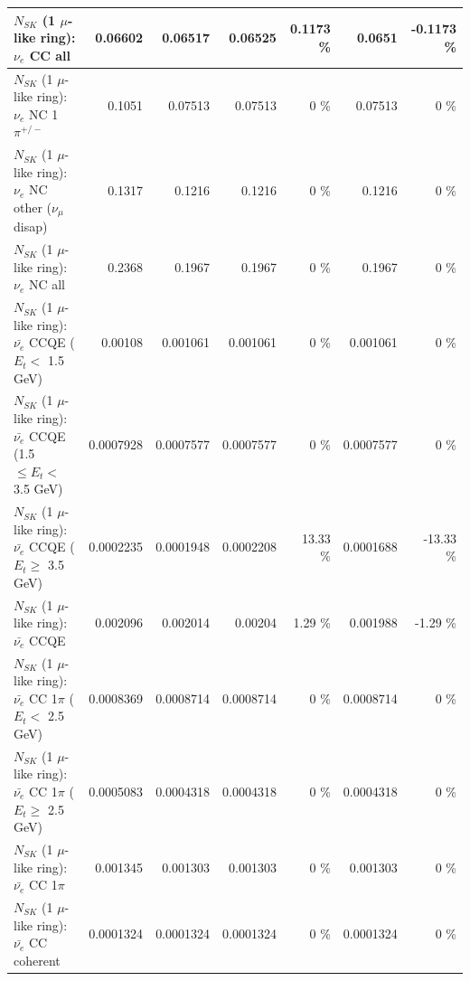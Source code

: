 \begin{table}
\begin{tabular}{| l | r | r | r  r | r  r |}
                                  $N_{SK}$ (1 $\mu$-like ring): $\nu_{e}$ CC all &         0.06602 &         0.06517 &         0.06525 &   0.1173 \%  &          0.0651 &  -0.1173 \%  \\ 
\hline
                           $N_{SK}$ (1 $\mu$-like ring): $\nu_e$ NC 1$\pi^{+/-}$ &          0.1051 &         0.07513 &         0.07513 &        0 \%  &         0.07513 &        0 \%  \\ 
                $N_{SK}$ (1 $\mu$-like ring): $\nu_e$ NC other ($\nu_\mu$ disap) &          0.1317 &          0.1216 &          0.1216 &        0 \%  &          0.1216 &        0 \%  \\ 
                                  $N_{SK}$ (1 $\mu$-like ring): $\nu_{e}$ NC all &          0.2368 &          0.1967 &          0.1967 &        0 \%  &          0.1967 &        0 \%  \\ 
\hline
\hline
\hline
            $N_{SK}$ (1 $\mu$-like ring): $\bar{\nu_e}$ CCQE ($E_{t} <$ 1.5 GeV) &         0.00108 &        0.001061 &        0.001061 &        0 \%  &        0.001061 &        0 \%  \\ 
   $N_{SK}$ (1 $\mu$-like ring): $\bar{\nu_e}$ CCQE (1.5 $\leq E_{t} <$ 3.5 GeV) &       0.0007928 &       0.0007577 &       0.0007577 &        0 \%  &       0.0007577 &        0 \%  \\ 
         $N_{SK}$ (1 $\mu$-like ring): $\bar{\nu_e}$ CCQE ($E_{t} \geq$ 3.5 GeV) &       0.0002235 &       0.0001948 &       0.0002208 &    13.33 \%  &       0.0001688 &   -13.33 \%  \\ 
\hline
                                $N_{SK}$ (1 $\mu$-like ring): $\bar{\nu_e}$ CCQE &        0.002096 &        0.002014 &         0.00204 &     1.29 \%  &        0.001988 &    -1.29 \%  \\ 
\hline
       $N_{SK}$ (1 $\mu$-like ring): $\bar{\nu_e}$ CC 1$\pi$ ($E_{t} <$ 2.5 GeV) &       0.0008369 &       0.0008714 &       0.0008714 &        0 \%  &       0.0008714 &        0 \%  \\ 
    $N_{SK}$ (1 $\mu$-like ring): $\bar{\nu_e}$ CC 1$\pi$ ($E_{t} \geq$ 2.5 GeV) &       0.0005083 &       0.0004318 &       0.0004318 &        0 \%  &       0.0004318 &        0 \%  \\ 
\hline
                           $N_{SK}$ (1 $\mu$-like ring): $\bar{\nu_e}$ CC 1$\pi$ &        0.001345 &        0.001303 &        0.001303 &        0 \%  &        0.001303 &        0 \%  \\ 
                         $N_{SK}$ (1 $\mu$-like ring): $\bar{\nu_e}$ CC coherent &       0.0001324 &       0.0001324 &       0.0001324 &        0 \%  &       0.0001324 &        0 \%  \\ 

\end{tabular}
\end{table}
